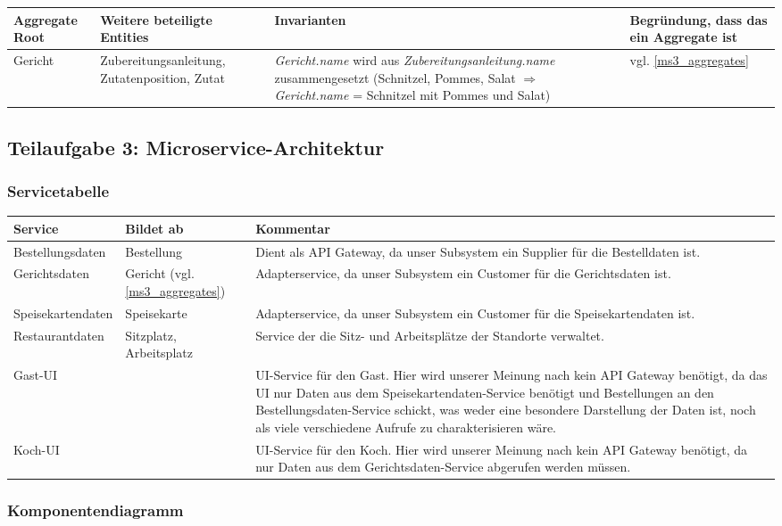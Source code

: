\begin{center}
\begin{tabu} to 
\hline{}
Aggregate Root &Weitere beteiligte Entities &Invarianten
  &Begr\"undung, dass das ein Aggregate ist \\
\hline
Gericht &Zubereitungsanleitung, Zutatenposition, Zutat
  &\textit{Gericht.name} wird aus
  \textit{Zubereitungsanleitung.name}
  zusammengesetzt (Schnitzel, Pommes, Salat $\Rightarrow$
  \textit{Gericht.name} = Schnitzel mit Pommes und Salat)
  &vgl. \ref{ms3_aggregates} \\
\hline
\end{tabu}
\end{center}

\subsection{Teilaufgabe 3: Microservice-Architektur}

\subsubsection{Servicetabelle}

\begin{tabu} to \linewidth {X|X|X}
\hline{}
Service &Bildet ab &Kommentar \\
\hline
Bestellungsdaten &Bestellung &Dient als API Gateway, da
  unser Subsystem ein Supplier f\"ur die Bestelldaten ist.
  \\
\hline
Gerichtsdaten &Gericht (vgl. \ref{ms3_aggregates})
  &Adapterservice, da unser Subsystem ein Customer f\"ur
  die Gerichtsdaten ist.\\
\hline
Speisekartendaten &Speisekarte &Adapterservice, da unser
  Subsystem ein Customer f\"ur die Speisekartendaten ist.\\
\hline
Restaurantdaten &Sitzplatz, Arbeitsplatz &Service der die
  Sitz- und Arbeitspl\"atze der Standorte verwaltet. \\
\hline
Gast-UI & &UI-Service f\"ur den Gast. Hier wird unserer
  Meinung nach kein API Gateway ben\"otigt, da das UI nur
  Daten aus dem Speisekartendaten-Service ben\"otigt und
  Bestellungen an den Bestellungsdaten-Service schickt,
  was weder eine besondere Darstellung der Daten ist, noch
  als viele verschiedene Aufrufe zu charakterisieren
  w\"are. \\
\hline
Koch-UI & &UI-Service f\"ur den Koch. Hier wird unserer
  Meinung nach kein API Gateway ben\"otigt, da nur Daten
  aus dem Gerichtsdaten-Service abgerufen werden m\"ussen.
  \\
\hline
\end{tabu}

\subsubsection{Komponentendiagramm}

